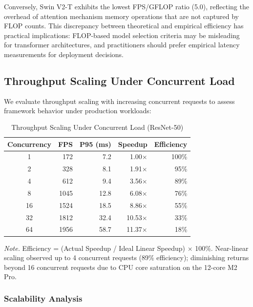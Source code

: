 \documentclass[10pt,twocolumn,a4paper]{article}
\theoremstyle{definition}
\theoremstyle{plain}
\newcommand{\timesX}[1]{#1$\times$}
\begin{document}
Conversely, Swin V2-T exhibits the lowest FPS/GFLOP ratio (5.0), reflecting the overhead of attention mechanism memory operations that are not captured by FLOP counts. This discrepancy between theoretical and empirical efficiency has practical implications: FLOP-based model selection criteria may be misleading for transformer architectures, and practitioners should prefer empirical latency measurements for deployment decisions.

\subsection{Throughput Scaling Under Concurrent Load}

We evaluate throughput scaling with increasing concurrent requests to assess framework behavior under production workloads:

\begin{table}[t]
\centering
\caption{Throughput Scaling Under Concurrent Load (ResNet-50)}
\label{tab:scaling}
\footnotesize
\setlength{\tabcolsep}{6pt}
\begin{tabular}{@{}crrrr@{}}
\toprule
\textbf{Concurrency} & \textbf{FPS} & \textbf{P95 (ms)} & \textbf{Speedup} & \textbf{Efficiency} \\
\midrule
1 & 172 & 7.2 & \timesX{1.00} & 100\% \\
2 & 328 & 8.1 & \timesX{1.91} & 95\% \\
4 & 612 & 9.4 & \timesX{3.56} & 89\% \\
8 & 1045 & 12.8 & \timesX{6.08} & 76\% \\
16 & 1524 & 18.5 & \timesX{8.86} & 55\% \\
32 & 1812 & 32.4 & \timesX{10.53} & 33\% \\
64 & 1956 & 58.7 & \timesX{11.37} & 18\% \\
\bottomrule
\end{tabular}

\vspace{0.5em}
\noindent\textit{Note.} Efficiency = (Actual Speedup / Ideal Linear Speedup) $\times$ 100\%. Near-linear scaling observed up to 4 concurrent requests (89\% efficiency); diminishing returns beyond 16 concurrent requests due to CPU core saturation on the 12-core M2 Pro.
\end{table}

\subsubsection{Scalability Analysis}
\end{document}
